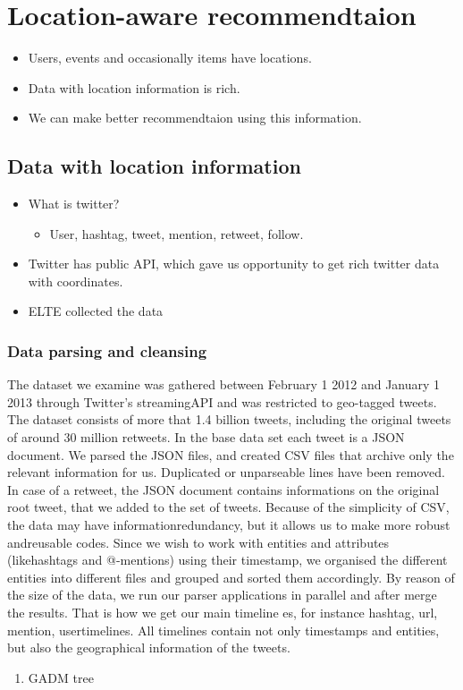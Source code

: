 \chapter{Location-aware recommendtaion}
\begin{itemize}
\item Users, events and occasionally items have locations.
\item Data with location information is rich.
\item We can make better recommendtaion using this information.
\end{itemize}

\section{Data with location information}
\begin{itemize}
\item What is twitter?
  \begin{itemize}
    \item User, hashtag, tweet, mention, retweet, follow.
  \end{itemize}
\item Twitter has public API, which gave us opportunity to get rich twitter
  data with coordinates.
\item ELTE collected the data
\end{itemize}

\subsection{Data parsing and cleansing}
The dataset we examine was gathered between February 1 2012 and January 1 2013
through Twitter's streamingAPI and was restricted to geo-tagged tweets. The
dataset consists of more that 1.4 billion tweets, including the original
tweets of around 30 million retweets. In the base data set each tweet is a
JSON document. We parsed the JSON files, and created CSV files that archive
only the relevant information for us. Duplicated or unparseable lines have been
removed. In case of a retweet, the JSON document contains informations on the
original root tweet, that we added to the set of tweets. Because of the
simplicity of CSV, the data may have informationredundancy, but it allows us
to make more robust andreusable codes. Since we wish to work with entities and
attributes (likehashtags and @-mentions) using their timestamp, we organised
the different entities into different files and grouped and sorted them
accordingly. By reason of the size of the data, we run our parser applications
in parallel and after merge the results. That is how we get our main timeline
es, for instance hashtag, url, mention, usertimelines. All timelines contain
not only timestamps and entities, but also the geographical information of the
tweets.
\begin{enumerate}
\item GADM tree
\end{enumerate}
